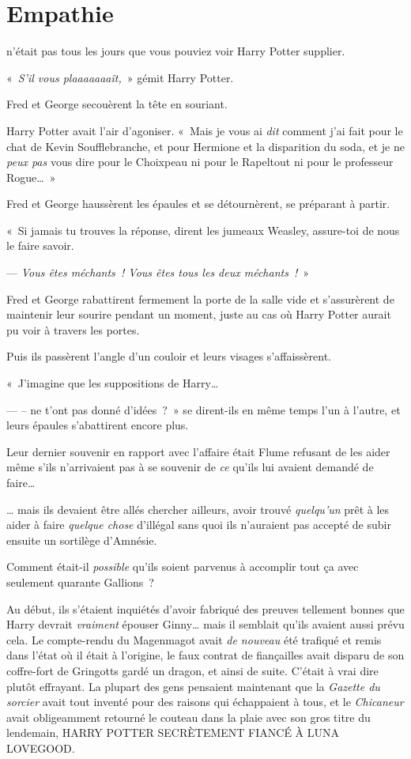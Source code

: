 \chapter{Empathie}

 n'était pas tous les jours que vous pouviez voir Harry Potter supplier.

\hplettrineextrapara
«~\emph{S'il vous plaaaaaaaît,}~» gémit Harry Potter.

Fred et George secouèrent la tête en souriant.

Harry Potter avait l'air d'agoniser. «~Mais je vous ai \emph{dit} comment j'ai fait pour le chat de Kevin Soufflebranche, et pour Hermione et la disparition du soda, et je ne \emph{peux pas} vous dire pour le Choixpeau ni pour le Rapeltout ni pour le professeur Rogue…~»

Fred et George haussèrent les épaules et se détournèrent, se préparant à partir.

«~Si jamais tu trouves la réponse, dirent les jumeaux Weasley, assure-toi de nous le faire savoir.

--- \emph{Vous êtes méchants~! Vous êtes tous les deux méchants~!}~»

Fred et George rabattirent fermement la porte de la salle vide et s'assurèrent de maintenir leur sourire pendant un moment, juste au cas où Harry Potter aurait pu voir à travers les portes.

Puis ils passèrent l'angle d'un couloir et leurs visages s'affaissèrent.

«~J'imagine que les suppositions de Harry…

--- -- ne t'ont pas donné d'idées~?~» se dirent-ils en même temps l'un à l'autre, et leurs épaules s'abattirent encore plus.

Leur dernier souvenir en rapport avec l'affaire était Flume refusant de les aider même s'ils n'arrivaient pas à se souvenir de \emph{ce} qu'ils lui avaient demandé de faire…

… mais ils devaient être allés chercher ailleurs, avoir trouvé \emph{quelqu'un} prêt à les aider à faire \emph{quelque chose} d'illégal sans quoi ils n'auraient pas accepté de subir ensuite un sortilège d'Amnésie.

Comment était-il \emph{possible} qu'ils soient parvenus à accomplir tout ça avec seulement quarante Gallions~?

Au début, ils s'étaient inquiétés d'avoir fabriqué des preuves tellement bonnes que Harry devrait \emph{vraiment} épouser Ginny… mais il semblait qu'ils avaient aussi prévu cela. Le compte-rendu du Magenmagot avait \emph{de nouveau} été trafiqué et remis dans l'état où il était à l'origine, le faux contrat de fiançailles avait disparu de son coffre-fort de Gringotts gardé un dragon, et ainsi de suite. C'était à vrai dire plutôt effrayant. La plupart des gens pensaient maintenant que la \emph{Gazette du sorcier} avait tout inventé pour des raisons qui échappaient à tous, et le \emph{Chicaneur} avait obligeamment retourné le couteau dans la plaie avec son gros titre du lendemain, HARRY POTTER SECRÈTEMENT FIANCÉ À LUNA LOVEGOOD.

